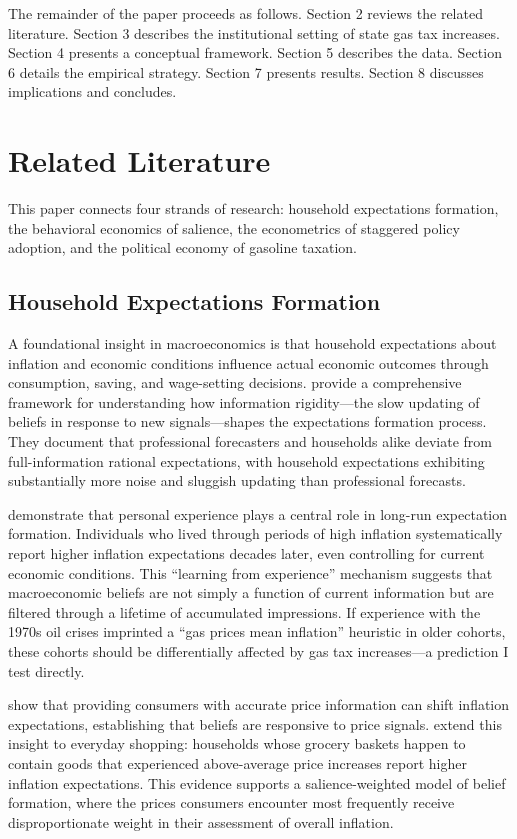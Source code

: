 \documentclass[12pt]{article}
\begin{document}
The remainder of the paper proceeds as follows. Section 2 reviews the related literature. Section 3 describes the institutional setting of state gas tax increases. Section 4 presents a conceptual framework. Section 5 describes the data. Section 6 details the empirical strategy. Section 7 presents results. Section 8 discusses implications and concludes.

\section{Related Literature}

This paper connects four strands of research: household expectations formation, the behavioral economics of salience, the econometrics of staggered policy adoption, and the political economy of gasoline taxation.

\subsection{Household Expectations Formation}

A foundational insight in macroeconomics is that household expectations about inflation and economic conditions influence actual economic outcomes through consumption, saving, and wage-setting decisions. \citet{coibion2015information} provide a comprehensive framework for understanding how information rigidity---the slow updating of beliefs in response to new signals---shapes the expectations formation process. They document that professional forecasters and households alike deviate from full-information rational expectations, with household expectations exhibiting substantially more noise and sluggish updating than professional forecasts.

\citet{malmendier2016learning} demonstrate that personal experience plays a central role in long-run expectation formation. Individuals who lived through periods of high inflation systematically report higher inflation expectations decades later, even controlling for current economic conditions. This ``learning from experience'' mechanism suggests that macroeconomic beliefs are not simply a function of current information but are filtered through a lifetime of accumulated impressions. If experience with the 1970s oil crises imprinted a ``gas prices mean inflation'' heuristic in older cohorts, these cohorts should be differentially affected by gas tax increases---a prediction I test directly.

\citet{cavallo2017inflation} show that providing consumers with accurate price information can shift inflation expectations, establishing that beliefs are responsive to price signals. \citet{dacunto2021exposure} extend this insight to everyday shopping: households whose grocery baskets happen to contain goods that experienced above-average price increases report higher inflation expectations. This evidence supports a salience-weighted model of belief formation, where the prices consumers encounter most frequently receive disproportionate weight in their assessment of overall inflation.
\end{document}
